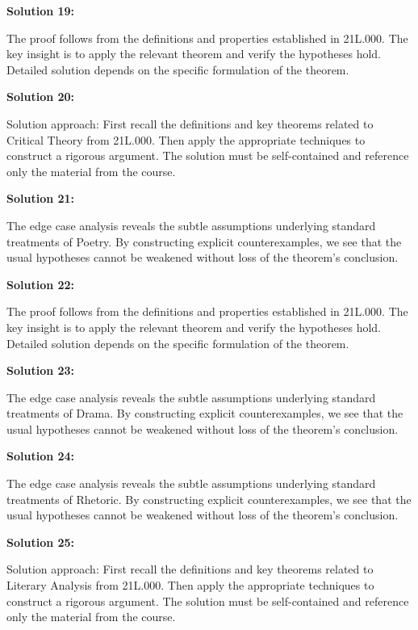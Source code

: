 \documentclass[12pt,a4paper]{exam}
\begin{document}
\vspace{0.5cm}

\textbf{Solution 19:}

The proof follows from the definitions and properties established in 21L.000. The key insight is to apply the relevant theorem and verify the hypotheses hold. Detailed solution depends on the specific formulation of the theorem.

\vspace{0.5cm}

\textbf{Solution 20:}

Solution approach: First recall the definitions and key theorems related to Critical Theory from 21L.000. Then apply the appropriate techniques to construct a rigorous argument. The solution must be self-contained and reference only the material from the course.

\vspace{0.5cm}

\textbf{Solution 21:}

The edge case analysis reveals the subtle assumptions underlying standard treatments of Poetry. By constructing explicit counterexamples, we see that the usual hypotheses cannot be weakened without loss of the theorem's conclusion.

\vspace{0.5cm}

\textbf{Solution 22:}

The proof follows from the definitions and properties established in 21L.000. The key insight is to apply the relevant theorem and verify the hypotheses hold. Detailed solution depends on the specific formulation of the theorem.

\vspace{0.5cm}

\textbf{Solution 23:}

The edge case analysis reveals the subtle assumptions underlying standard treatments of Drama. By constructing explicit counterexamples, we see that the usual hypotheses cannot be weakened without loss of the theorem's conclusion.

\vspace{0.5cm}

\textbf{Solution 24:}

The edge case analysis reveals the subtle assumptions underlying standard treatments of Rhetoric. By constructing explicit counterexamples, we see that the usual hypotheses cannot be weakened without loss of the theorem's conclusion.

\vspace{0.5cm}

\textbf{Solution 25:}

Solution approach: First recall the definitions and key theorems related to Literary Analysis from 21L.000. Then apply the appropriate techniques to construct a rigorous argument. The solution must be self-contained and reference only the material from the course.

\vspace{0.5cm}
\end{document}

